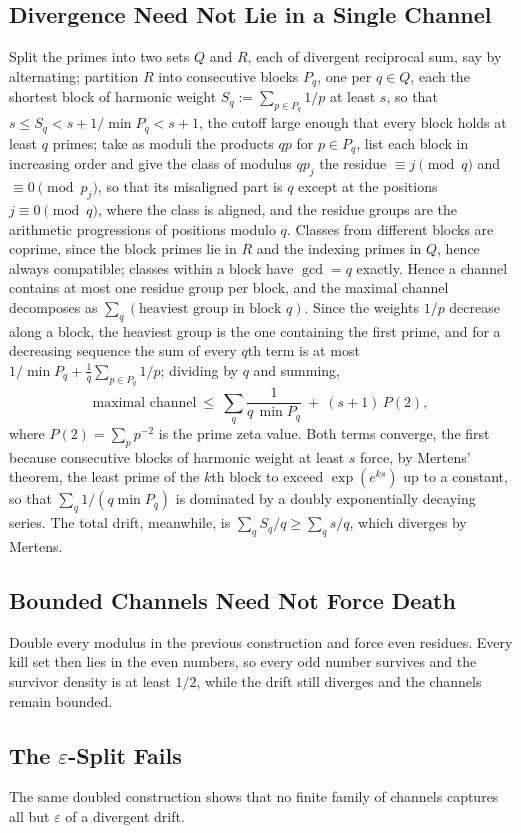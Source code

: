 \documentclass[11pt]{article}
\theoremstyle{plain}
\theoremstyle{definition}
\begin{document}
\subsection*{Divergence Need Not Lie in a Single Channel}
Split the primes into two sets $Q$ and $R$, each of divergent
reciprocal sum, say by alternating; partition $R$ into
consecutive blocks $P_q$, one per $q\in Q$, each the shortest
block of harmonic weight $S_q:=\sum_{p\in P_q}1/p$ at least $s$,
so that $s\le S_q<s+1/\min P_q<s+1$, the cutoff large enough
that every block holds at least $q$ primes; take as moduli the products $qp$ for $p\in P_q$, list each
block in increasing order and give the class of modulus $qp_j$
the residue $\equiv j\pmod q$ and $\equiv0\pmod{p_j}$, so that its
misaligned part is $q$ except at the positions $j\equiv0\pmod q$,
where the class is aligned, and the residue groups are the
arithmetic progressions of positions modulo $q$.  Classes from different
blocks are coprime, since the block primes lie in $R$ and the
indexing primes in $Q$, hence always compatible; classes within
a block have $\gcd=q$ exactly.  Hence a channel contains at most one residue
group per block, and the maximal channel decomposes as
$\sum_q(\text{heaviest group in block }q)$.  Since the weights
$1/p$ decrease along a block, the heaviest group is the one
containing the first prime, and for a decreasing sequence the
sum of every $q$th term is at most
$1/\min P_q+\tfrac1q\sum_{p\in P_q}1/p$; dividing by $q$ and
summing,
\[
  \text{maximal channel}\ \le\
  \sum_q\frac{1}{q\,\min P_q}\ +\ (s+1)\,P(2),
\]
where $P(2)=\sum_p p^{-2}$ is the prime zeta value.  Both terms
converge, the first because consecutive blocks of harmonic
weight at least $s$ force, by Mertens' theorem, the least prime
of the $k$th block to exceed $\exp(e^{ks})$ up to a constant,
so that $\sum_q1/(q\min P_q)$ is dominated by a doubly
exponentially decaying series.  The
total drift, meanwhile, is $\sum_q S_q/q\ge\sum_q s/q$, which
diverges by Mertens.

\subsection*{Bounded Channels Need Not Force Death}
Double every modulus in the previous construction and force even
residues.  Every kill set then lies in the even numbers, so every
odd number survives and the survivor density is at least
$1/2$, while the drift still diverges and the channels remain
bounded.

\subsection*{The $\varepsilon$-Split Fails}
The same doubled construction shows that no finite family of
channels captures all but $\varepsilon$ of a divergent drift.
\end{document}
